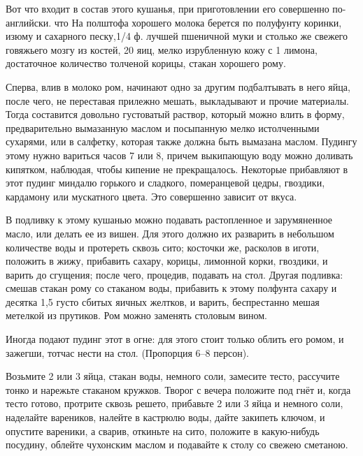 
Вот что входит в состав этого кушанья, при приготовлении его совершенно по-английски. что На полштофа хорошего молока берется по полуфунту коринки, изюму и сахарного песку,1/4 ф. лучшей пшеничной муки и столько же свежего говяжьего мозгу из костей, 20 яиц, мелко изрубленную кожу с 1 лимона, достаточное количество толченой корицы, стакан хорошего рому. 

Сперва, влив в молоко ром, начинают одно за другим подбалтывать в него яйца, после чего, не переставая прилежно мешать, выкладывают и прочие материалы. Тогда составится довольно густоватый раствор, который можно влить в форму, предварительно вымазанную маслом и посыпанную мелко истолченными сухарями, или в салфетку, которая также должна быть вымазана маслом. Пудингу этому нужно вариться часов 7 или 8, причем выкипающую воду можно доливать кипятком, наблюдая, чтобы кипение не прекращалось. Некоторые прибавляют в этот пудинг миндалю горького и сладкого, померанцевой цедры, гвоздики, кардамону или мускатного цвета. Это совершенно зависит от вкуса.

В подливку к этому кушанью можно подавать растопленное и зарумяненное масло, или делать ее из вишен. Для этого должно их разварить в небольшом количестве воды и протереть сквозь сито; косточки же, расколов в иготи, положить в жижу, прибавить сахару, корицы, лимонной корки, гвоздики, и варить до сгущения; после чего, процедив, подавать на стол. Другая подливка: смешав стакан рому со стаканом воды, прибавить к этому полфунта сахару и десятка 1,5 густо сбитых яичных желтков, и варить, беспрестанно мешая метелкой из прутиков. Ром можно заменять столовым вином.

Иногда подают пудинг этот в огне: для этого стоит только облить его ромом, и зажегши, тотчас нести на стол. (Пропорция 6--8 персон). 


Возьмите 2 или 3 яйца, стакан воды, немного соли, замесите тесто, рассучите тонко и нарежьте стаканом кружков. Творог с вечера положите под гнёт и, когда тесто готово, протрите сквозь решето, прибавьте 2 или 3 яйца и немного соли, наделайте вареников, налейте в кастрюлю воды, дайте закипеть ключом, и опустите вареники, а сварив, откиньте на сито, положите в какую-нибудь посудину, облейте чухонским маслом и подавайте к столу со свежею сметаною. 


